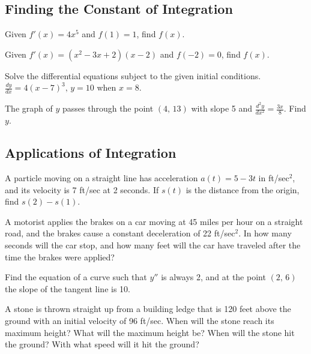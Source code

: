 \documentclass[addpoints, 12pt]{exam}
\begin{document}
\newpage
{}
\subsection*{Finding the Constant of Integration}

\begin{questions}
    \question Given $f'(x)=4x^5$ and $f(1)=1$, find $f(x)$.
    
    \question Given $f'(x)=(x^2-3x+2)(x-2)$ and $f(-2)=0$, find $f(x)$.
    
    Solve the differential equations subject to the given initial conditions.
    \question $\displaystyle\frac{dy}{dx}=4(x-7)^3,\,y=10$ when $x=8$.
    
    \question The graph of $y$ passes through the point $(4,\,13)$ with slope 5 and $\displaystyle\frac{d^2y}{dx^2}=\frac{3x}{8}$. Find $y$.
\end{questions}

\subsection*{Applications of Integration}
\begin{questions}
    \setcounter{question}{4}
    \question A particle moving on a straight line has acceleration $a(t)=5-3t$ in ft/sec$^2$, and its velocity is 7 ft/sec at 2 seconds. If $s(t)$ is the distance from the origin, find $s(2)-s(1)$.
    
    
    \newpage
    
    \question A motorist applies the brakes on a car moving at 45 miles per hour on a straight road, and the brakes cause a constant deceleration of 22 ft/sec$^2$. In how many seconds will the car stop, and how many feet will the car have traveled after the time the brakes were applied?
    
    \question Find the equation of a curve such that $y''$ is always 2, and at the point $(2,\,6)$ the slope of the tangent line is 10.
    
    \question A stone is thrown straight up from a building ledge that is 120 feet above the ground with an initial velocity of 96 ft/sec. When will the stone reach its maximum height? What will the maximum height be? When will the stone hit the ground? With what speed will it hit the ground?
    
    
\end{questions}
\end{document}

